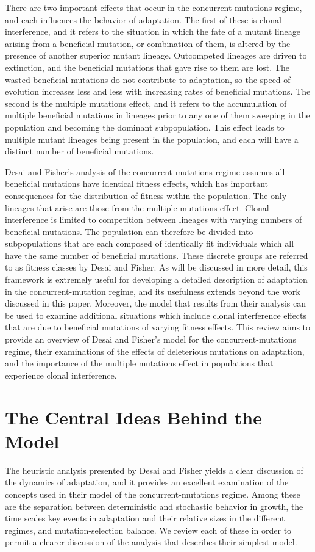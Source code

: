 \documentclass[12pt, one column]{article}
\begin{document}
There are two important effects that occur in the concurrent-mutations regime, and each influences the behavior of adaptation.  The first of these is clonal interference, and it refers to the situation in which the fate of a mutant lineage arising from a beneficial mutation, or combination of them, is altered by the presence of another superior mutant lineage.  Outcompeted lineages are driven to extinction, and the beneficial mutations that gave rise to them are lost.  The wasted beneficial mutations do not contribute to adaptation, so the speed of evolution increases less and less with increasing rates of beneficial mutations.  The second is the multiple mutations effect, and it refers to the accumulation of multiple beneficial mutations in lineages prior to any one of them sweeping in the population and becoming the dominant subpopulation.  This effect leads to multiple mutant lineages being present in the population, and each will have a distinct number of beneficial mutations.    

Desai and Fisher's analysis of the concurrent-mutations regime assumes all beneficial mutations have identical fitness effects, which has important consequences for the distribution of fitness within the population.  The only lineages that arise are those from the multiple mutations effect. Clonal interference is limited to competition between lineages with varying numbers of beneficial mutations.  The population can therefore be divided into subpopulations that are each composed of identically fit individuals which all have the same number of beneficial mutations.  These discrete groups are referred to as fitness classes by Desai and Fisher.  As will be discussed in more detail, this framework is extremely useful for developing a detailed description of adaptation in the concurrent-mutation regime, and its usefulness extends beyond the work discussed in this paper.  Moreover, the model that results from their analysis can be used to examine additional situations which include clonal interference effects that are due to beneficial mutations of varying fitness effects.  This review aims to provide an overview of Desai and Fisher's model for the concurrent-mutations regime, their examinations of the effects of deleterious mutations on adaptation, and the importance of the multiple mutations effect in populations that experience clonal interference.

\section*{The Central Ideas Behind the Model}
The heuristic analysis presented by Desai and Fisher yields a clear discussion of the dynamics of adaptation, and it provides an excellent examination of the concepts used in their model of the concurrent-mutations regime.  Among these are the separation between deterministic and stochastic behavior in growth, the time scales key events in adaptation and their relative sizes in the different regimes, and mutation-selection balance.  We review each of these in order to permit a clearer discussion of the analysis that describes their simplest model.     
\end{document}
